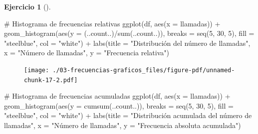 \documentclass[
  a4paper,
]{scrreport}
\newenvironment{Shaded}{\begin{snugshade}}{\end{snugshade}}
\newcommand{\AttributeTok}[1]{\textcolor[rgb]{0.40,0.45,0.13}{#1}}
\newcommand{\CommentTok}[1]{\textcolor[rgb]{0.37,0.37,0.37}{#1}}
\newcommand{\DecValTok}[1]{\textcolor[rgb]{0.68,0.00,0.00}{#1}}
\newcommand{\FunctionTok}[1]{\textcolor[rgb]{0.28,0.35,0.67}{#1}}
\newcommand{\NormalTok}[1]{\textcolor[rgb]{0.00,0.23,0.31}{#1}}
\newcommand{\SpecialCharTok}[1]{\textcolor[rgb]{0.37,0.37,0.37}{#1}}
\newcommand{\StringTok}[1]{\textcolor[rgb]{0.13,0.47,0.30}{#1}}
\theoremstyle{definition}
\newtheorem{exercise}{Ejercicio}[chapter]
\theoremstyle{remark}
\begin{document}
\begin{exercise}[]
\begin{tcolorbox}
\begin{Shaded}
\begin{Highlighting}[]
\CommentTok{\# Histograma de frecuencias relativas}
\FunctionTok{ggplot}\NormalTok{(df, }\FunctionTok{aes}\NormalTok{(}\AttributeTok{x =}\NormalTok{ llamadas)) }\SpecialCharTok{+}
    \FunctionTok{geom\_histogram}\NormalTok{(}\FunctionTok{aes}\NormalTok{(}\AttributeTok{y =}\NormalTok{ (..count..)}\SpecialCharTok{/}\FunctionTok{sum}\NormalTok{(..count..)), }\AttributeTok{breaks =} \FunctionTok{seq}\NormalTok{(}\DecValTok{5}\NormalTok{, }\DecValTok{30}\NormalTok{, }\DecValTok{5}\NormalTok{), }\AttributeTok{fill =} \StringTok{"steelblue"}\NormalTok{, }\AttributeTok{col =} \StringTok{"white"}\NormalTok{) }\SpecialCharTok{+}
    \FunctionTok{labs}\NormalTok{(}\AttributeTok{title =} \StringTok{"Distribución del número de llamadas"}\NormalTok{, }\AttributeTok{x =} \StringTok{"Número de llamadas"}\NormalTok{, }\AttributeTok{y =} \StringTok{"Frecuencia relativa"}\NormalTok{)}
\end{Highlighting}
\end{Shaded}

\begin{figure}[H]

{\centering \texttt{[image: ./03-frecuencias-graficos\_files/figure-pdf/unnamed-chunk-17-2.pdf]}

}

\end{figure}

\begin{Shaded}
\begin{Highlighting}[]
\CommentTok{\# Histograma de frecuencias acumuladas}
\FunctionTok{ggplot}\NormalTok{(df, }\FunctionTok{aes}\NormalTok{(}\AttributeTok{x =}\NormalTok{ llamadas)) }\SpecialCharTok{+}
    \FunctionTok{geom\_histogram}\NormalTok{(}\FunctionTok{aes}\NormalTok{(}\AttributeTok{y =} \FunctionTok{cumsum}\NormalTok{(..count..)), }\AttributeTok{breaks =} \FunctionTok{seq}\NormalTok{(}\DecValTok{5}\NormalTok{, }\DecValTok{30}\NormalTok{, }\DecValTok{5}\NormalTok{), }\AttributeTok{fill =} \StringTok{"steelblue"}\NormalTok{, }\AttributeTok{col =} \StringTok{"white"}\NormalTok{) }\SpecialCharTok{+}
    \FunctionTok{labs}\NormalTok{(}\AttributeTok{title =} \StringTok{"Distribución acumulada del número de llamadas"}\NormalTok{, }\AttributeTok{x =} \StringTok{"Número de llamadas"}\NormalTok{, }\AttributeTok{y =} \StringTok{"Frecuencia absoluta acumulada"}\NormalTok{)}
\end{Highlighting}
\end{Shaded}


\end{tcolorbox}
\end{exercise}
\end{document}
